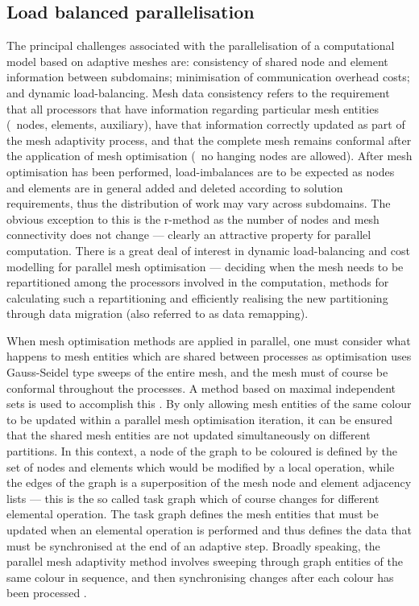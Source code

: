 \subsection{Load balanced parallelisation}
The principal challenges associated with the parallelisation of a
computational model based on adaptive meshes are: consistency of
shared node and element information between subdomains; minimisation
of communication overhead costs; and dynamic load-balancing. Mesh data
consistency refers to the requirement that all processors that have
information regarding particular mesh entities (\ie\ nodes, elements,
auxiliary), have that information correctly updated as part of the
mesh adaptivity process, and that the complete mesh remains conformal
after the application of mesh optimisation (\ie\ no hanging nodes are
allowed). After mesh optimisation has been performed, load-imbalances
are to be expected as nodes and elements are in general added and
deleted according to solution requirements, thus the distribution of
work may vary across subdomains. The obvious exception to this is the
r-method as the number of nodes and mesh connectivity does not change
--- clearly an attractive property for parallel computation.  There is
a great deal of interest in dynamic load-balancing and cost modelling
for parallel mesh optimisation --- deciding when the mesh needs to be
repartitioned among the processors involved in the computation,
methods for calculating such a repartitioning and efficiently
realising the new partitioning through data migration (also referred
to as data remapping).

When mesh optimisation methods are applied in parallel, one must
consider what happens to mesh entities which are shared between
processes as optimisation uses Gauss-Seidel type sweeps of the entire
mesh, and the mesh must of course be conformal throughout the
processes. A method based on maximal independent sets is used to
accomplish this \citep{jones1997, freitag1999b, freitag1999}. By only
allowing mesh entities of the same colour to be updated within a
parallel mesh optimisation iteration, it can be ensured that the
shared mesh entities are not updated simultaneously on different
partitions. In this context, a node of the graph to be coloured is
defined by the set of nodes and elements which would be modified by a
local operation, while the edges of the graph is a superposition of
the mesh node and element adjacency lists --- this is the so called
task graph which of course changes for different elemental
operation. The task graph defines the mesh entities that must be
updated when an elemental operation is performed and thus defines the
data that must be synchronised at the end of an adaptive step. Broadly
speaking, the parallel mesh adaptivity method involves sweeping
through graph entities of the same colour in sequence, and then
synchronising changes after each colour has been processed
\citep{freitag1999}.

